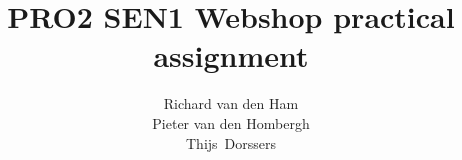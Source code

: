 \author{Richard van den Ham\\ Pieter van den Hombergh\\Thijs~Dorssers}
\lstset{tabsize=4,language=Java}
\title{PRO2 SEN1 Webshop practical assignment}

\providecommand\Application{Provide an application name}
\providecommand\Customer{Provide a customer name}
\usepackage{mdwlist}
\usepackage{metainfo}
\providecommand{\MineOnlyStart}{}
\providecommand{\MineOnlyEnd}{}
\usepackage{pdflscape}
\usepackage{sebicrccards}
\usepackage{sebirequirements}
\usepackage[toc]{multitoc}
